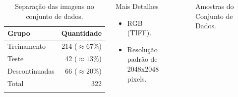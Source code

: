 \documentclass[%
  10pt,%
  aspectratio = 169,%
  compress,%
  t,%
  english,%
  brazilian,%
  tikz,
]{beamer}
\begin{document}
\begin{frame}
\begin{columns}[T]
\begin{table}[!htb]
\centering%
\caption{Separação das imagens no conjunto de dados.}%
\label{tab:separacao}
\begin{tabular*}{\columnwidth}{@{\extracolsep{\fill}}lr}
\toprule
Grupo   & Quantidade     \\
\midrule
Treinamento             & 214 ($\approx 67\%$) \\
Teste                   & 42 ($\approx 13\%$) \\
Descontinuadas          & 66 ($\approx 20\%$) \\
Total                   & 322 \\
\bottomrule
\addlinespace
\end{tabular*}
\end{table}
\begin{block}{Mais Detalhes}
    \begin{itemize}
        \item RGB (TIFF).
        \item Resolução padrão de 2048x2048 pixels.
    \end{itemize}
\end{block}
\begin{figure}[!htb]
\centering%
\caption{Amostras do Conjunto de Dados.}%
\label{fig:obter_imagens}
\end{figure}
\end{columns}
\end{frame}
\end{document}
